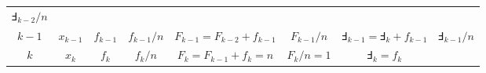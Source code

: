 \documentclass[
]{book}
\theoremstyle{definition}
\theoremstyle{definition}
\theoremstyle{definition}
\theoremstyle{remark}
\begin{document}
\begin{longtable}[]{@{}cccccccc@{}}
\begin{minipage}[t]{0.10\columnwidth}
\(\Finv_{k-2}/n\)\strut
\end{minipage}\tabularnewline
\begin{minipage}[t]{0.06\columnwidth}\centering
\(k-1\)\strut
\end{minipage} & \begin{minipage}[t]{0.06\columnwidth}\centering
\(x_{k-1}\)\strut
\end{minipage} & \begin{minipage}[t]{0.06\columnwidth}\centering
\(f_{k-1}\)\strut
\end{minipage} & \begin{minipage}[t]{0.07\columnwidth}\centering
\(f_{k-1}/n\)\strut
\end{minipage} & \begin{minipage}[t]{0.15\columnwidth}\centering
\(F_{k-1}=F_{k-2}+f_{k-1}\)\strut
\end{minipage} & \begin{minipage}[t]{0.07\columnwidth}\centering
\(F_{k-1}/n\)\strut
\end{minipage} & \begin{minipage}[t]{0.20\columnwidth}\centering
\(\Finv_{k-1}=\Finv_{k}+f_{k-1}\)\strut
\end{minipage} & \begin{minipage}[t]{0.10\columnwidth}\centering
\(\Finv_{k-1}/n\)\strut
\end{minipage}\tabularnewline
\begin{minipage}[t]{0.06\columnwidth}\centering
\(k\)\strut
\end{minipage} & \begin{minipage}[t]{0.06\columnwidth}\centering
\(x_{k}\)\strut
\end{minipage} & \begin{minipage}[t]{0.06\columnwidth}\centering
\(f_{k}\)\strut
\end{minipage} & \begin{minipage}[t]{0.07\columnwidth}\centering
\(f_{k}/n\)\strut
\end{minipage} & \begin{minipage}[t]{0.15\columnwidth}\centering
\(F_{k}=F_{k-1}+f_{k}=n\)\strut
\end{minipage} & \begin{minipage}[t]{0.07\columnwidth}\centering
\(F_{k}/n=1\)\strut
\end{minipage} & \begin{minipage}[t]{0.20\columnwidth}\centering
\(\Finv_{k}=f_{k}\)\strut
\end{minipage} & \begin{minipage}[t]{0.10\columnwidth}\centering

\end{minipage}
\end{longtable}
\end{document}
